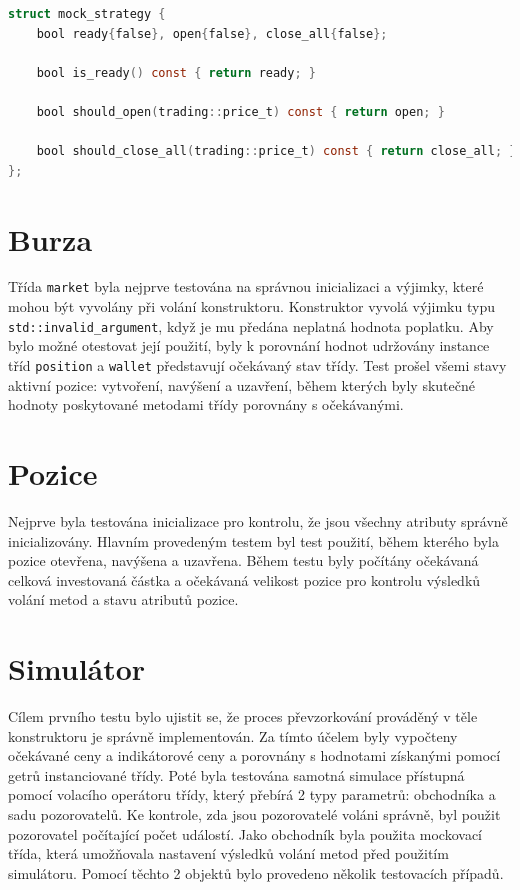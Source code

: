 \begin{lstlisting}[caption={~Implementace falešná strategie},label={lst:mock:strategy},captionpos=t,abovecaptionskip=-\medskipamount,belowcaptionskip=\medskipamount,language=C]
struct mock_strategy {
    bool ready{false}, open{false}, close_all{false};

    bool is_ready() const { return ready; }

    bool should_open(trading::price_t) const { return open; }

    bool should_close_all(trading::price_t) const { return close_all; }
};
\end{lstlisting}

\section{Burza}
Třída \texttt{market} byla nejprve testována na správnou inicializaci a výjimky, které mohou být vyvolány při volání konstruktoru.
Konstruktor vyvolá výjimku typu \texttt{std::invalid\_argument}, když je mu předána neplatná hodnota poplatku.
Aby bylo možné otestovat její použití, byly k porovnání hodnot udržovány instance tříd \texttt{position} a \texttt{wallet} představují očekávaný stav třídy.
Test prošel všemi stavy aktivní pozice: vytvoření, navýšení a uzavření, během kterých byly skutečné hodnoty poskytované metodami třídy porovnány s očekávanými.

\section{Pozice}
Nejprve byla testována inicializace pro kontrolu, že jsou všechny atributy správně inicializovány.
Hlavním provedeným testem byl test použití, během kterého byla pozice otevřena, navýšena a uzavřena.
Během testu byly počítány očekávaná celková investovaná částka a očekávaná velikost pozice pro kontrolu výsledků volání metod a stavu atributů pozice.

\section{Simulátor}
Cílem prvního testu bylo ujistit se, že proces převzorkování prováděný v těle konstruktoru je správně implementován.
Za tímto účelem byly vypočteny očekávané ceny a indikátorové ceny a porovnány s hodnotami získanými pomocí getrů instanciované třídy.
Poté byla testována samotná simulace přístupná pomocí volacího operátoru třídy, který přebírá 2 typy parametrů: obchodníka a sadu pozorovatelů.
Ke kontrole, zda jsou pozorovatelé voláni správně, byl použit pozorovatel počítající počet událostí.
Jako obchodník byla použita mockovací třída, která umožňovala nastavení výsledků volání metod před použitím simulátoru.
Pomocí těchto 2 objektů bylo provedeno několik testovacích případů.

